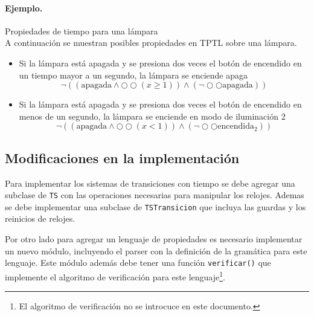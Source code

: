 \paragraph{Ejemplo.} Propiedades de tiempo para una lámpara\\
A continuación se muestran posibles propiedades en TPTL sobre una lámpara.
\begin{itemize}
\item Si la lámpara está apagada y se presiona dos veces el botón
 de encendido en un tiempo mayor a un segundo, la lámpara se enciende apaga
\[ \lnot ((\text{apagada} \wedge \bigcirc \bigcirc (x \geq 1)) \wedge (\lnot \bigcirc \bigcirc \text{apagada})) \]
\item Si la lámpara está apagada y se presiona dos veces el botón
 de encendido en menos de un segundo, la lámpara se enciende en modo de iluminación 2
\[ \lnot ((\text{apagada} \wedge \bigcirc \bigcirc (x < 1)) \wedge (\lnot \bigcirc \bigcirc \text{encendida}_2)) \]
\end{itemize}


\subsection{Modificaciones en la implementación}
Para implementar los sistemas de transiciones con tiempo se debe agregar una subclase
 de \texttt{TS} con las operaciones necesarias para manipular los relojes.
Ademas se debe implementar una subclase de \texttt{TSTransicion} que incluya las
 guardas y los reinicios de relojes.

Por otro lado para agregar un lenguaje de propiedades es necesario implementar un nuevo
 módulo, incluyendo el parser con la definición de la gramática para este lenguaje.
Este módulo además debe tener una función \texttt{verificar()} que implemente el algoritmo
 de verificación para este lenguaje\footnote{El algoritmo de verificación no se introcuce
 en este documento.}.